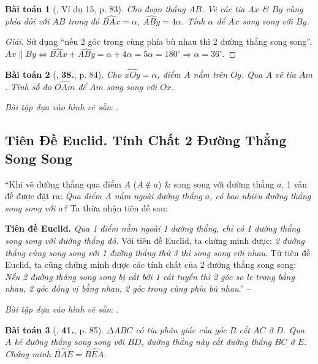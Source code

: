 \documentclass{article}
\numberwithin{equation}{section}
\newtheorem{baitoan}{Bài toán}[section]
\begin{document}
\begin{baitoan}[\cite{Binh_Toan_7_tap_1}, Ví dụ 15, p. 83]
	Cho đoạn thẳng $AB$. Vẽ các tia $Ax$ \& $By$ cùng phía đối với $AB$ trong đó $\widehat{BAx} = \alpha$, $\widehat{ABy} = 4\alpha$. Tính $\alpha$ để $Ax$ song song với $By$.
\end{baitoan}

\begin{proof}[Giải]
	Sử dụng ``nếu 2 góc trong cùng phía bù nhau thì 2 đường thẳng song song''. $Ax\parallel By\Leftrightarrow\widehat{BAx} + \widehat{ABy} = \alpha + 4\alpha = 5\alpha = 180^\circ\Rightarrow\alpha = 36^\circ$.
\end{proof}

\begin{baitoan}[\cite{Binh_Toan_7_tap_1}, \textbf{38.}, p. 84]
	Cho $\widehat{xOy} = \alpha$, điểm $A$ nằm trên $Oy$. Qua $A$ vẽ tia $Am$. Tính số đo $\widehat{OAm}$ để $Am$ song song với $Ox$.
\end{baitoan}
\textit{Bài tập dựa vào hình vẽ sẵn}: \cite[\textbf{37.}, \textbf{39.}, p. 84, \textbf{44.}, \textbf{45.}, p. 87]{Binh_Toan_7_tap_1}.


\subsection{Tiên Đề Euclid. Tính Chất 2 Đường Thẳng Song Song}
``Khi vẽ đường thẳng qua điểm $A$ ($A\notin a$) \& song song với đường thẳng $a$, 1 vấn đề được đặt ra: \textit{Qua điểm $A$ nằm ngoài đường thẳng $a$, có bao nhiêu đường thẳng song song với $a$?} Ta thừa nhận tiên đề sau:

\textbf{Tiên đề Euclid.} \textit{Qua 1 điểm nằm ngoài 1 đường thẳng, chỉ có 1 đường thẳng song song với đường thẳng đó.} Với tiên đề Euclid, ta chứng minh được: \textit{2 đường thẳng cùng song song với 1 đường thẳng thứ 3 thì song song với nhau}. Từ tiên đề Euclid, ta cũng chứng minh được các tính chất của 2 đường thẳng song song: \textit{Nếu 2 đường thẳng song song bị cắt bởi 1 cát tuyến thì 2 góc so le trong bằng nhau, 2 góc đồng vị bằng nhau, 2 góc trong cùng phía bù nhau}.'' -- \cite[\S7, p. 84]{Binh_Toan_7_tap_1}

\textit{Bài tập dựa vào hình vẽ sẵn}: \cite[Ví dụ 16, p. 84, \textbf{40.}, p. 85]{Binh_Toan_7_tap_1}.

\begin{baitoan}[\cite{Binh_Toan_7_tap_1}, \textbf{41.}, p. 85]
	$\Delta ABC$ có tia phân giác của góc $B$ cắt $AC$ ở $D$. Qua $A$ kẻ đường thẳng song song với $BD$, đường thẳng này cắt đường thẳng $BC$ ở $E$. Chứng minh $\widehat{BAE} = \widehat{BEA}$.
\end{baitoan}
\end{document}
